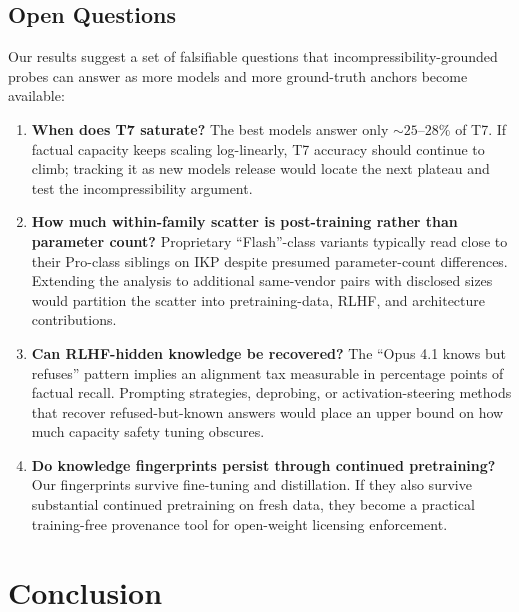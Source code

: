 \documentclass[11pt]{article}
\begin{document}
\subsection{Open Questions}
\label{sec:open-questions}

Our results suggest a set of falsifiable questions that incompressibility-grounded probes can answer as more models and more ground-truth anchors become available:

\begin{enumerate}[leftmargin=*]
    \item \textbf{When does T7 saturate?} The best models answer only ${\sim}25$--$28\%$ of T7. If factual capacity keeps scaling log-linearly, T7 accuracy should continue to climb; tracking it as new models release would locate the next plateau and test the incompressibility argument.
    \item \textbf{How much within-family scatter is post-training rather than parameter count?} Proprietary ``Flash''-class variants typically read close to their Pro-class siblings on IKP despite presumed parameter-count differences. Extending the analysis to additional same-vendor pairs with disclosed sizes would partition the scatter into pretraining-data, RLHF, and architecture contributions.
    \item \textbf{Can RLHF-hidden knowledge be recovered?} The ``Opus 4.1 knows but refuses'' pattern implies an alignment tax measurable in percentage points of factual recall. Prompting strategies, deprobing, or activation-steering methods that recover refused-but-known answers would place an upper bound on how much capacity safety tuning obscures.
    \item \textbf{Do knowledge fingerprints persist through continued pretraining?} Our fingerprints survive fine-tuning and distillation. If they also survive substantial continued pretraining on fresh data, they become a practical training-free provenance tool for open-weight licensing enforcement.
\end{enumerate}

\section{Conclusion}
\label{sec:conclusion}
\end{document}
